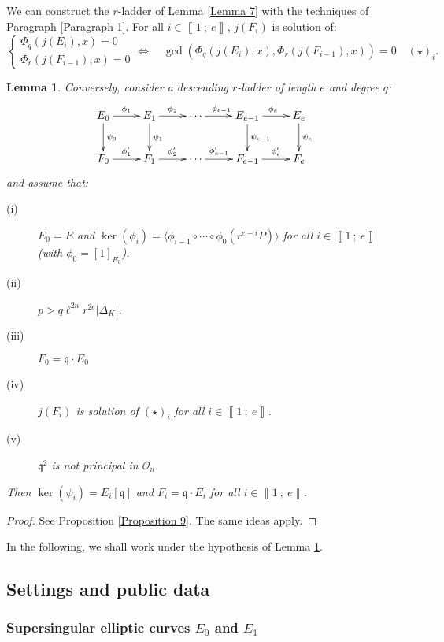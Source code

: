 \documentclass[a4paper,10pt,notitlepage]{report}
\theoremstyle{definition}
\theoremstyle{plain}
\newtheorem{Lemma}[Definition]{Lemma}
\theoremstyle{definition}
\newcommand{\mO}{\mathcal{O}}
\renewcommand{\i}[2]{\left\llbracket #1~;~#2\right\rrbracket}
\renewcommand{\(}{\left(}
\renewcommand{\)}{\right)}
\newcommand{\mf}[1]{\mathfrak{#1}}
\begin{document}
We can construct the $r$-ladder of Lemma \ref{Lemma 7} with the techniques of Paragraph \ref{Paragraph 1}. For all $i\in\i{1}{e}$, $j(F_i)$ is solution of:
\[\left\{\begin{array}{c}
\Phi_q(j(E_i),x)=0\\
\Phi_r(j(F_{i-1}),x)=0
\end{array}\right. \Longleftrightarrow \quad \gcd(\Phi_q(j(E_i),x),\Phi_r(j(F_{i-1}),x))=0\quad (\star)_i.\]

\begin{Lemma}\label{Lemma 6}
Conversely, consider a descending $r$-ladder of length $e$ and degree $q$:
\[\xymatrix{
E_0 \ar[d]^{\psi_0} \ar[r]^{\phi_1} & E_1\ar[d]^{\psi_1} \ar[r]^{\phi_{2}}& \cdots \ar[r]^{\phi_{e-1}} & E_{e-1} \ar[d]^{\psi_{e-1}} \ar[r]^{\phi_{e}} & E_e \ar[d]^{\psi_e}\\
F_0 \ar[r]^-{\phi'_1} & F_1 \ar[r]^-{\phi'_{2}}& \cdots \ar[r]^-{\phi'_{e-1}} & F_{e-1} \ar[r]^-{\phi'_{e}} & F_e
}\]
and assume that:
\begin{description}
\item[(i)] $E_0=E$ and $\ker(\phi_i)=\langle\phi_{i-1}\circ \cdots\circ\phi_0(r^{e-i}P)\rangle$ for all $i\in\i{1}{e}$ (with $\phi_0=[1]_{E_0}$).
\item[(ii)] $p>q\ell^{2n}r^{2e}|\Delta_K|$.
\item[(iii)] $F_0=\mf{q}\cdot E_0$
\item[(iv)] $j(F_i)$ is solution of $(\star)_i$ for all $i\in\i{1}{e}$.
\item[(v)] $\mf{q}^2$ is not principal in $\mO_n$. 
\end{description}
Then $\ker(\psi_i)=E_i[\mf{q}]$ and $F_i=\mf{q}\cdot E_i$ for all $i\in\i{1}{e}$.
\end{Lemma}

\begin{proof}
See Proposition \ref{Proposition 9}. The same ideas apply.
\end{proof}

In the following, we shall work under the hypothesis of Lemma \ref{Lemma 6}.

\subsection{Settings and public data}

\subsubsection{Supersingular elliptic curves $E_0$ and $E_1$}
\end{document}
